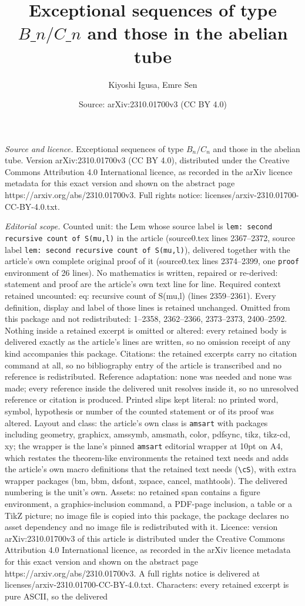 \documentclass[10pt,a4paper]{amsart}
\title[Exceptional sequences of type $B\_n/C\_n$ and those in the abe]{Exceptional sequences of type $B\_n/C\_n$ and those in the abelian tube}
\author{Kiyoshi Igusa, Emre Sen}
\date{Source: arXiv:2310.01700v3 (CC BY 4.0)}
\begin{document}
\maketitle

\noindent\emph{Source and licence.} Exceptional sequences of type $B_n/C_n$ and those in the abelian tube. Version arXiv:2310.01700v3 (CC BY 4.0), distributed under the Creative Commons Attribution 4.0 International licence, as recorded in the arXiv licence metadata for this exact version and shown on the abstract page https://arxiv.org/abs/2310.01700v3. Full rights notice: licenses/arxiv-2310.01700-CC-BY-4.0.txt.\par\smallskip

\noindent\textit{Editorial scope.} Counted unit: the Lem whose source label is \texttt{lem: second recursive count of S(mu,l)} in the article (source0.tex lines 2367--2372, source label \texttt{lem: second recursive count of S(mu,l)}), delivered together with the article's own complete original proof of it (source0.tex lines 2374--2399, one \texttt{proof} environment of 26 lines). No mathematics is written, repaired or re-derived: statement and proof are the article's own text line for line. Required context retained uncounted: eq: recursive count of S(mu,l) (lines 2359--2361). Every definition, display and label of those lines is retained unchanged. Omitted from this package and not redistributed: 1--2358, 2362--2366, 2373--2373, 2400--2592. Nothing inside a retained excerpt is omitted or altered: every retained body is delivered exactly as the article's lines are written, so no omission receipt of any kind accompanies this package. Citations: the retained excerpts carry no citation command at all, so no bibliography entry of the article is transcribed and no reference is redistributed. Reference adaptation: none was needed and none was made; every reference inside the delivered unit resolves inside it, so no unresolved reference or citation is produced. Printed slips kept literal: no printed word, symbol, hypothesis or number of the counted statement or of its proof was altered. Layout and class: the article's own class is \texttt{amsart} with packages including geometry, graphicx, amssymb, amsmath, color, pdfsync, tikz, tikz-cd, xy; the wrapper is the lane's pinned \texttt{amsart} editorial wrapper at 10pt on A4, which restates the theorem-like environments the retained text needs and adds the article's own macro definitions that the retained text needs (\texttt{\textbackslash cS}), with extra wrapper packages (bm, bbm, dsfont, xspace, cancel, mathtools). The delivered numbering is the unit's own. Assets: no retained span contains a figure environment, a graphics-inclusion command, a PDF-page inclusion, a table or a TikZ picture; no image file is copied into this package, the package declares no asset dependency and no image file is redistributed with it. Licence: version arXiv:2310.01700v3 of this article is distributed under the Creative Commons Attribution 4.0 International licence, as recorded in the arXiv licence metadata for this exact version and shown on the abstract page https://arxiv.org/abs/2310.01700v3. A full rights notice is delivered at licenses/arxiv-2310.01700-CC-BY-4.0.txt. Characters: every retained excerpt is pure ASCII, so the delivered 
\end{document}
